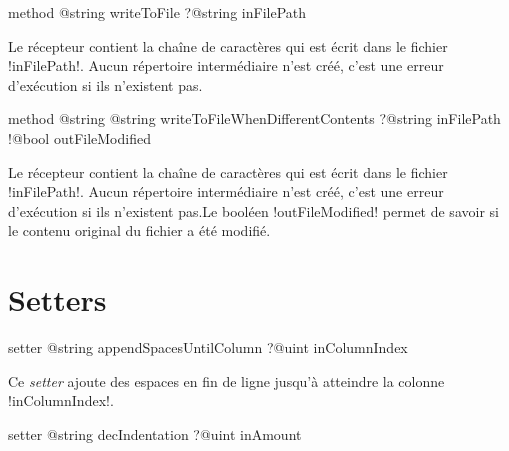 
\begin{galgas3box}
method @string writeToFile ?@string inFilePath
\end{galgas3box}

Le récepteur contient la chaîne de caractères qui est écrit dans le fichier \ggst!inFilePath!. Aucun répertoire intermédiaire n'est créé, c'est une erreur d'exécution si ils n'existent pas.










\begin{galgas3box}
method @string @string writeToFileWhenDifferentContents
    ?@string inFilePath
    !@bool outFileModified
\end{galgas3box}

Le récepteur contient la chaîne de caractères qui est écrit dans le fichier \ggst!inFilePath!. Aucun répertoire intermédiaire n'est créé, c'est une erreur d'exécution si ils n'existent pas.Le booléen \ggst!outFileModified! permet de savoir si le contenu original du fichier a été modifié.















\section{Setters}


\begin{galgas3box}
setter @string appendSpacesUntilColumn ?@uint inColumnIndex
\end{galgas3box}

Ce \emph{setter} ajoute des espaces en fin de ligne jusqu'à atteindre la colonne \ggst!inColumnIndex!.





\begin{galgas3box}
setter @string decIndentation ?@uint inAmount
\end{galgas3box}

